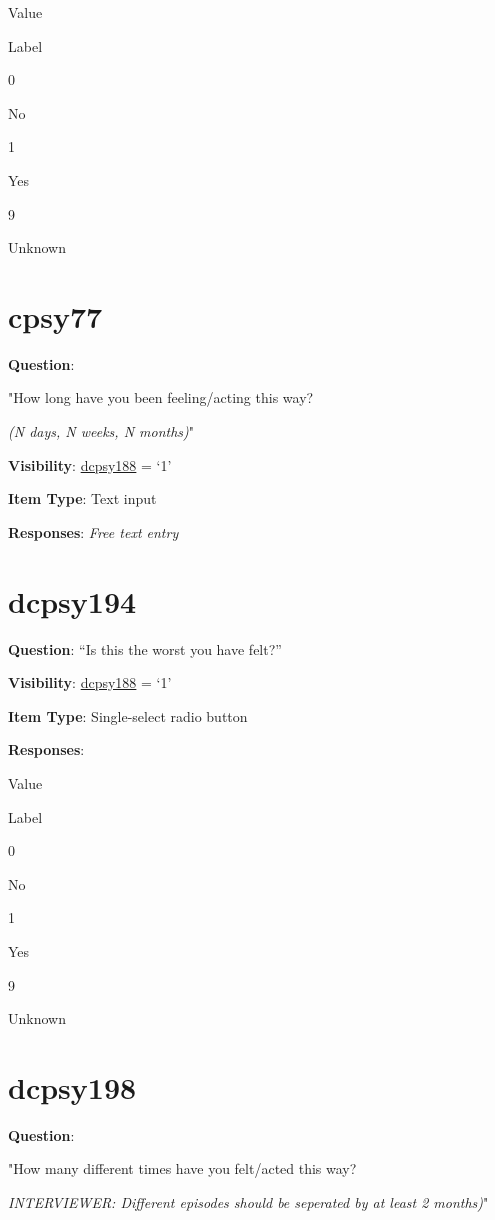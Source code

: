 \documentclass[]{book}
\begin{document}
Value

Label

0

No

1

Yes

9

Unknown

\hypertarget{cpsy77}{%
\section{cpsy77}\label{cpsy77}}

\textbf{Question}:

"How long have you been feeling/acting this way?

\emph{(N days, N weeks, N months)}"

\textbf{Visibility}: \protect\hyperlink{dcpsy188}{dcpsy188} = `1'

\textbf{Item Type}: Text input

\textbf{Responses}: \emph{Free text entry}

\hypertarget{dcpsy194}{%
\section{dcpsy194}\label{dcpsy194}}

\textbf{Question}: ``Is this the worst you have felt?''

\textbf{Visibility}: \protect\hyperlink{dcpsy188}{dcpsy188} = `1'

\textbf{Item Type}: Single-select radio button

\textbf{Responses}:

Value

Label

0

No

1

Yes

9

Unknown

\hypertarget{dcpsy198}{%
\section{dcpsy198}\label{dcpsy198}}

\textbf{Question}:

"How many different times have you felt/acted this way?

\emph{INTERVIEWER: Different episodes should be seperated by at least 2 months)}"
\end{document}
